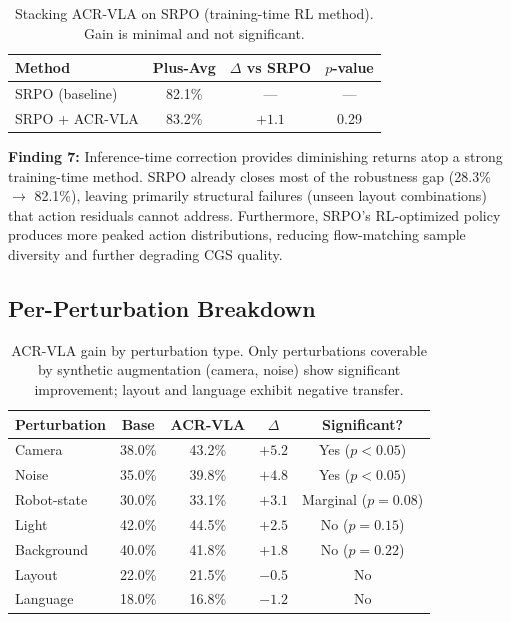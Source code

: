 \documentclass[letterpaper]{article}
\begin{document}
\begin{table}[h]
\centering
\caption{Stacking ACR-VLA on SRPO (training-time RL method). Gain is minimal and not significant.}
\label{tab:srpo}
\begin{tabular}{lccc}
\toprule
Method & Plus-Avg & $\Delta$ vs SRPO & $p$-value \\
\midrule
SRPO (baseline) & 82.1\% & --- & --- \\
SRPO + ACR-VLA & 83.2\% & $+1.1$ & 0.29 \\
\bottomrule
\end{tabular}
\end{table}

\textbf{Finding 7:} Inference-time correction provides diminishing returns atop a strong training-time method. SRPO already closes most of the robustness gap (28.3\% $\to$ 82.1\%), leaving primarily structural failures (unseen layout combinations) that action residuals cannot address. Furthermore, SRPO's RL-optimized policy produces more peaked action distributions, reducing flow-matching sample diversity and further degrading CGS quality.

\subsection{Per-Perturbation Breakdown}
\label{sec:exp-perturb}

\begin{table}[h]
\centering
\caption{ACR-VLA gain by perturbation type. Only perturbations coverable by synthetic augmentation (camera, noise) show significant improvement; layout and language exhibit negative transfer.}
\label{tab:perturb}
\begin{tabular}{lcccc}
\toprule
Perturbation & Base & ACR-VLA & $\Delta$ & Significant? \\
\midrule
Camera & 38.0\% & 43.2\% & $+5.2$ & Yes ($p<0.05$) \\
Noise & 35.0\% & 39.8\% & $+4.8$ & Yes ($p<0.05$) \\
Robot-state & 30.0\% & 33.1\% & $+3.1$ & Marginal ($p{=}0.08$) \\
Light & 42.0\% & 44.5\% & $+2.5$ & No ($p{=}0.15$) \\
Background & 40.0\% & 41.8\% & $+1.8$ & No ($p{=}0.22$) \\
Layout & 22.0\% & 21.5\% & $-0.5$ & No \\
Language & 18.0\% & 16.8\% & $-1.2$ & No \\
\bottomrule
\end{tabular}
\end{table}
\end{document}
